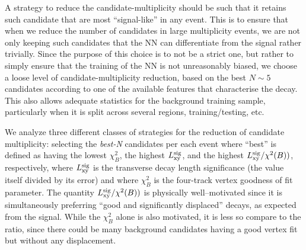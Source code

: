 A strategy to reduce the candidate-multiplicity should be such that it retains such candidate that are most ``signal-like'' in any event.
This is to ensure that when we reduce the number of candidates in large multiplicity events, we are not only keeping such candidates that the NN can differentiate from the signal rather trivially.
Since the purpose of this choice is to not be a strict one, but rather to simply ensure that the training of the NN is not unreasonably biased, we choose a loose level of candidate-multiplicity reduction, based on the best $N\sim 5$ candidates according to one of the available features that characterise the decay.
This also allows adequate statistics for the background training sample, particularly when it is split across several regions, training/testing, etc.

We analyze three different classes of strategies for the reduction of candidate multiplicity: selecting the \emph{best-N} candidates per each event where ``best'' is defined as having the lowest $\chi^2_{B}$, the highest $L_{\rm xy}^\text{sig}$, and the highest $L_{\rm xy}^\text{sig}/\chi^2(B))$, respectively, where $L_{\rm xy}^\text{sig}$ is the transverse decay length  significance (the value itself divided by its error) and where $\chi^2_{B}$ is the four-track vertex goodness of fit parameter.
The quantity $L_{\rm xy}^\text{sig}/\chi^2(B))$ is physically well--motivated since it is simultaneously preferring ``good and significantly displaced'' decays, as expected from the signal.
While the $\chi^2_{B}$ alone is also motivated, it is less so compare to the ratio, since there could be many background candidates having a good vertex fit but without any displacement.

